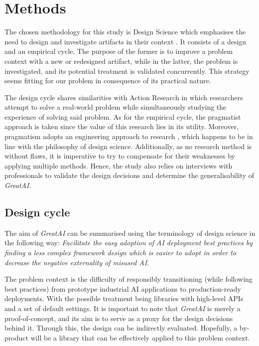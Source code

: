 \chapter{Methods} \label{chapter:methods}

The chosen methodology for this study is Design Science which emphasises the need to design and investigate artifacts in their context \cite{wieringa2014design}. It consists of a design and an empirical cycle. The purpose of the former is to improve a problem context with a new or redesigned artifact, while in the latter, the problem is investigated, and its potential treatment is validated concurrently. This strategy seems fitting for our problem in consequence of its practical nature.

The design cycle shares similarities with Action Research \cite{davison2004principles} in which researchers attempt to solve a real-world problem while simultaneously studying the experience of solving said problem. As for the empirical cycle, the pragmatist approach is taken since the value of this research lies in its utility. Moreover, pragmatism adopts an engineering approach to research \cite{shull2007guide}, which happens to be in line with the philosophy of design science. Additionally, as no research method is without flaws, it is imperative to try to compensate for their weaknesses by applying multiple methods. Hence, the study also relies on interviews with professionals to validate the design decisions and determine the generalisability of \textit{GreatAI}.

\section{Design cycle}

The aim of \textit{GreatAI} can be summarised using the terminology of design science in the following way: 
\textit{Facilitate the easy adoption of AI deployment best practices
by finding a less complex framework design 
which is easier to adopt
in order to decrease the negative externality of misused AI.}

The problem context is the difficulty of responsibly transitioning (while following best practices) from prototype industrial AI applications to production-ready deployments. With the possible treatment being libraries with high-level APIs and a set of default settings. It is important to note that \textit{GreatAI} is merely a proof-of-concept, and its aim is to serve as a proxy for the design decisions behind it. Through this, the design can be indirectly evaluated. Hopefully, a by-product will be a library that can be effectively applied to this problem context.

